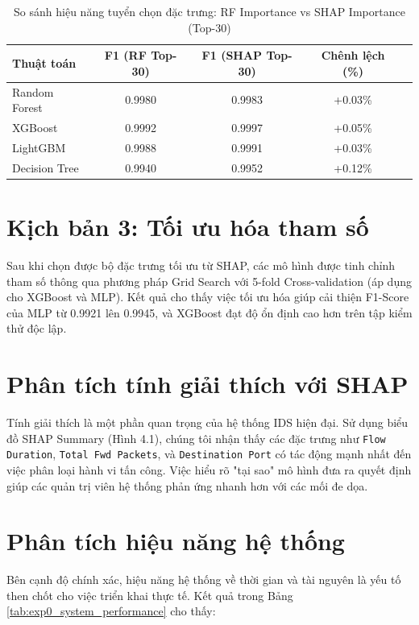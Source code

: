 \begin{table}[htbp]
\centering
\caption{So sánh hiệu năng tuyển chọn đặc trưng: RF Importance vs SHAP Importance (Top-30)}
\label{tab:rf_vs_shap}
\begin{tabular*}{\textwidth}{@{\extracolsep{\fill}}lcccc@{}}
\toprule
\textbf{Thuật toán} & \textbf{F1 (RF Top-30)} & \textbf{F1 (SHAP Top-30)} & \textbf{Chênh lệch (\%)} \\ \midrule
Random Forest & 0.9980 & 0.9983 & +0.03\% \\
XGBoost & 0.9992 & 0.9997 & +0.05\% \\
LightGBM & 0.9988 & 0.9991 & +0.03\% \\
Decision Tree & 0.9940 & 0.9952 & +0.12\% \\ \bottomrule
\end{tabular*}
\end{table}

\section{Kịch bản 3: Tối ưu hóa tham số}
Sau khi chọn được bộ đặc trưng tối ưu từ SHAP, các mô hình được tinh chỉnh tham số thông qua phương pháp Grid Search với 5-fold Cross-validation (áp dụng cho XGBoost và MLP).
Kết quả cho thấy việc tối ưu hóa giúp cải thiện F1-Score của MLP từ 0.9921 lên 0.9945, và XGBoost đạt độ ổn định cao hơn trên tập kiểm thử độc lập.

\section{Phân tích tính giải thích với SHAP}
Tính giải thích là một phần quan trọng của hệ thống IDS hiện đại. Sử dụng biểu đồ SHAP Summary (Hình 4.1), chúng tôi nhận thấy các đặc trưng như \texttt{Flow Duration}, \texttt{Total Fwd Packets}, và \texttt{Destination Port} có tác động mạnh nhất đến việc phân loại hành vi tấn công. Việc hiểu rõ "tại sao" mô hình đưa ra quyết định giúp các quản trị viên hệ thống phản ứng nhanh hơn với các mối đe dọa.

\section{Phân tích hiệu năng hệ thống}
Bên cạnh độ chính xác, hiệu năng hệ thống về thời gian và tài nguyên là yếu tố then chốt cho việc triển khai thực tế.
Kết quả trong Bảng \ref{tab:exp0_system_performance} cho thấy:

